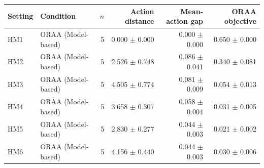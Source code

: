 \begin{tabular}{llrrrr}
\toprule
Setting & Condition & $n$ & Action distance & Mean-action gap & ORAA objective \\
\midrule
HM1 & ORAA (Model-based) & 5 & 0.000 $\pm$ 0.000 & 0.000 $\pm$ 0.000 & 0.650 $\pm$ 0.000 \\
HM2 & ORAA (Model-based) & 5 & 2.526 $\pm$ 0.748 & 0.086 $\pm$ 0.041 & 0.340 $\pm$ 0.081 \\
HM3 & ORAA (Model-based) & 5 & 4.505 $\pm$ 0.774 & 0.081 $\pm$ 0.009 & 0.054 $\pm$ 0.013 \\
HM4 & ORAA (Model-based) & 5 & 3.658 $\pm$ 0.307 & 0.058 $\pm$ 0.004 & 0.031 $\pm$ 0.005 \\
HM5 & ORAA (Model-based) & 5 & 2.830 $\pm$ 0.277 & 0.044 $\pm$ 0.003 & 0.021 $\pm$ 0.002 \\
HM6 & ORAA (Model-based) & 5 & 4.156 $\pm$ 0.440 & 0.044 $\pm$ 0.003 & 0.030 $\pm$ 0.006 \\
\bottomrule
\end{tabular}
